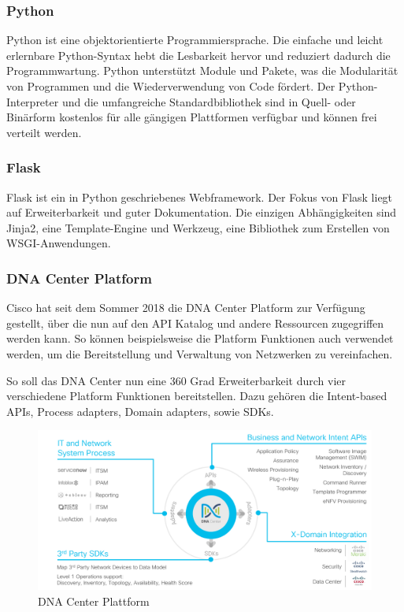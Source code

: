 \subsubsection{Python}
Python ist eine objektorientierte Programmiersprache. Die einfache und leicht erlernbare Python-Syntax hebt die Lesbarkeit hervor und reduziert dadurch die Programmwartung. Python unterstützt Module und Pakete, was die Modularität von Programmen und die Wiederverwendung von Code fördert. Der Python-Interpreter und die umfangreiche Standardbibliothek sind in Quell- oder Binärform kostenlos für alle gängigen Plattformen verfügbar und können frei verteilt werden. \cite{python}

\subsubsection{Flask}
Flask ist ein in Python geschriebenes Webframework. Der Fokus von Flask liegt auf Erweiterbarkeit und guter Dokumentation. Die einzigen Abhängigkeiten sind Jinja2, eine Template-Engine und Werkzeug, eine Bibliothek zum Erstellen von WSGI-Anwendungen. \cite{flask}

\subsubsection{DNA Center Platform}
Cisco hat seit dem Sommer 2018 die DNA Center Platform zur Verfügung gestellt, über die nun auf den API Katalog und andere Ressourcen zugegriffen werden kann. So können beispielsweise die Platform Funktionen auch verwendet werden, um die Bereitstellung und Verwaltung von Netzwerken zu vereinfachen.


So soll das DNA Center nun eine 360 Grad Erweiterbarkeit durch vier verschiedene Platform Funktionen bereitstellen. Dazu gehören die Intent-based APIs, Process adapters, Domain adapters, sowie SDKs. \cite{dnac-platform}

\begin{figure}[H]
	\centering
	\includegraphics[width=0.8\linewidth]{img/Abstrahierung/dnac-platform}
	\caption{DNA Center Plattform \cite{dnac-platform}}
	\label{fig:DNA Center Plattform}
\end{figure}


